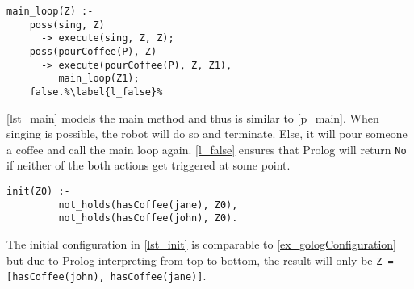 \begin{lstlisting}[firstnumber=10, caption={Main method which either tells the robot to sing or to pour coffee.}, label=lst_main]
  main_loop(Z) :-
    poss(sing, Z)
      -> execute(sing, Z, Z);
    poss(pourCoffee(P), Z)
      -> execute(pourCoffee(P), Z, Z1),
         main_loop(Z1);
    false.%\label{l_false}%
\end{lstlisting}
\autoref{lst_main} models the main method and thus is similar to \autoref{p_main}. When singing is possible, the robot will do so and terminate. Else, it will pour someone a coffee and call the main loop again. \autoref{l_false} ensures that Prolog will return \texttt{No} if neither of the both actions get triggered at some point.
\begin{lstlisting}[firstnumber=17, caption={Initial configuration.}, label=lst_init]
  init(Z0) :-
         not_holds(hasCoffee(jane), Z0),
         not_holds(hasCoffee(john), Z0).
\end{lstlisting}
The initial configuration in \autoref{lst_init} is comparable to \autoref{ex_gologConfiguration} but due to Prolog interpreting from top to bottom, the result will only be \texttt{Z = [hasCoffee(john), hasCoffee(jane)]}.
